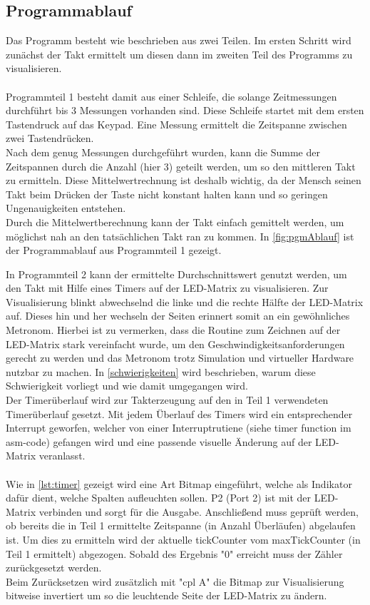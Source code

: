 \documentclass[a4paper, 12pt]{scrartcl}
\begin{document}
\begin{onehalfspace}
\subsection{Programmablauf}
Das Programm besteht wie beschrieben aus zwei Teilen. Im ersten Schritt wird zunächst der Takt ermittelt um diesen dann im zweiten Teil des Programms zu visualisieren.
\\
\\
Programmteil 1 besteht damit aus einer Schleife, die solange Zeitmessungen durchführt bis 3 Messungen vorhanden sind. Diese Schleife startet mit dem ersten Tastendruck auf das Keypad. Eine Messung ermittelt die Zeitspanne zwischen zwei Tastendrücken. 
\\
Nach dem genug Messungen durchgeführt wurden, kann die Summe der Zeitspannen durch die Anzahl (hier 3) geteilt werden, um so den mittleren Takt zu ermitteln. Diese Mittelwertrechnung ist deshalb wichtig, da der Mensch seinen Takt beim Drücken der Taste nicht konstant halten kann und so geringen Ungenauigkeiten entstehen.
\\
Durch die Mittelwertberechnung kann der Takt einfach gemittelt werden, um möglichst nah an den tatsächlichen Takt ran zu kommen. In \autoref{fig:pgmAblauf} ist der Programmablauf aus Programmteil 1 gezeigt.

In Programmteil 2 kann der ermittelte Durchschnittswert genutzt werden, um den Takt mit Hilfe eines Timers auf der LED-Matrix zu visualisieren. Zur Visualisierung blinkt abwechselnd die linke und die rechte Hälfte der LED-Matrix auf. Dieses hin und her wechseln der Seiten erinnert somit an ein gewöhnliches Metronom. Hierbei ist zu vermerken, dass die Routine zum Zeichnen auf der LED-Matrix stark vereinfacht wurde, um den Geschwindigkeitsanforderungen gerecht zu werden und das Metronom trotz Simulation und virtueller Hardware nutzbar zu machen. In \autoref{schwierigkeiten} wird beschrieben, warum diese Schwierigkeit vorliegt und wie damit umgegangen wird.
\\  
Der Timerüberlauf wird zur Takterzeugung auf den in Teil 1 verwendeten Timerüberlauf gesetzt. Mit jedem Überlauf des Timers wird ein entsprechender Interrupt geworfen, welcher von einer Interruptrutiene (siehe timer function im asm-code) gefangen wird und eine passende visuelle Änderung auf der LED-Matrix veranlasst.
\\
\\
Wie in \autoref{lst:timer} gezeigt wird eine Art Bitmap eingeführt, welche als Indikator dafür dient, welche Spalten aufleuchten sollen. P2 (Port 2) ist mit der LED-Matrix verbinden und sorgt für die Ausgabe. Anschließend muss geprüft werden, ob bereits die in Teil 1 ermittelte Zeitspanne (in Anzahl Überläufen) abgelaufen ist. Um dies zu ermitteln wird der aktuelle tickCounter vom maxTickCounter (in Teil 1 ermittelt) abgezogen. Sobald des Ergebnis "0" erreicht muss der Zähler zurückgesetzt werden.
\\
Beim Zurücksetzen wird zusätzlich mit "cpl A" die Bitmap zur Visualisierung bitweise invertiert um so die leuchtende Seite der LED-Matrix zu ändern.


\end{onehalfspace}
\end{document}
